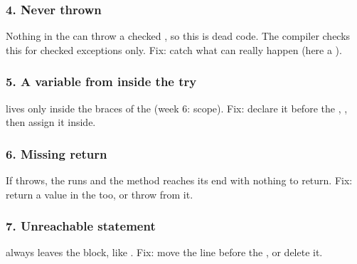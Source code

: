 \documentclass[aspectratio=169,10pt,compress]{beamer}
\begin{document}
\begin{frame}[t,fragile] \frametitle{4. Never thrown}

	\footnotesize Nothing in the  can throw a checked , so this  is dead code.
	The compiler checks this for checked exceptions only. Fix: catch what can really happen (here a ).
\end{frame}




\begin{frame}[t,fragile] \frametitle{5. A variable from inside the try}

	\footnotesize {} lives only inside the braces of the  (week 6: scope). Fix: declare it before the ,
	, then assign it inside.
\end{frame}




\begin{frame}[t,fragile] \frametitle{6. Missing return}

	\footnotesize If  throws, the  runs and the method reaches its end with nothing to return.
	Fix: return a value in the  too, or throw from it.
\end{frame}




\begin{frame}[t,fragile] \frametitle{7. Unreachable statement}

	\footnotesize {} always leaves the block, like . Fix: move the line before the , or delete it.
\end{frame}
\end{document}
